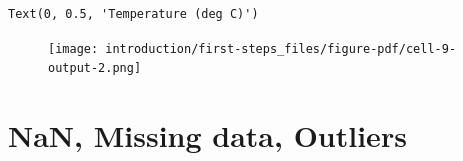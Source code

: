 \documentclass[
  letterpaper,
  DIV=11,
  numbers=noendperiod,
  oneside]{scrreprt}
\begin{document}
\begin{verbatim}
Text(0, 0.5, 'Temperature (deg C)')
\end{verbatim}

\begin{figure}[H]

{\centering \texttt{[image: introduction/first-steps\_files/figure-pdf/cell-9-output-2.png]}

}

\end{figure}

\hypertarget{nan-missing-data-outliers}{%
\section{NaN, Missing data, Outliers}\label{nan-missing-data-outliers}}
\end{document}
